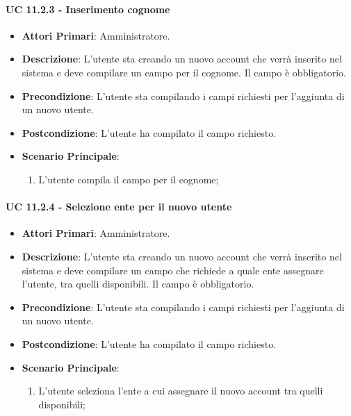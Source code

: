 			\paragraph{UC 11.2.3 - Inserimento cognome}
			\begin{itemize}
				\item \textbf{Attori Primari}: Amministratore.
				\item \textbf{Descrizione}: L'utente sta creando un nuovo account che verrà inserito nel sistema e deve compilare un campo per il cognome. Il campo è obbligatorio.
				\item \textbf{Precondizione}: L'utente sta compilando i campi richiesti per l'aggiunta di un nuovo utente.
				\item \textbf{Postcondizione}: L'utente ha compilato il campo richiesto.
				\item \textbf{Scenario Principale}:
				\begin{enumerate}
					\item{L'utente compila il campo per il cognome;}
				\end{enumerate}	
			\end{itemize}

			\paragraph{UC 11.2.4 - Selezione ente per il nuovo utente}
			\begin{itemize}
				\item \textbf{Attori Primari}: Amministratore.
				\item \textbf{Descrizione}: L'utente sta creando un nuovo account che verrà inserito nel sistema e deve compilare un campo che richiede a quale ente assegnare l'utente, tra quelli disponibili. Il campo è obbligatorio.
				\item \textbf{Precondizione}: L'utente sta compilando i campi richiesti per l'aggiunta di un nuovo utente.
				\item \textbf{Postcondizione}: L'utente ha compilato il campo richiesto.
				\item \textbf{Scenario Principale}:
				\begin{enumerate}
					\item{L'utente seleziona l'ente a cui assegnare il nuovo account tra quelli disponibili;}
				\end{enumerate}	
			\end{itemize}

